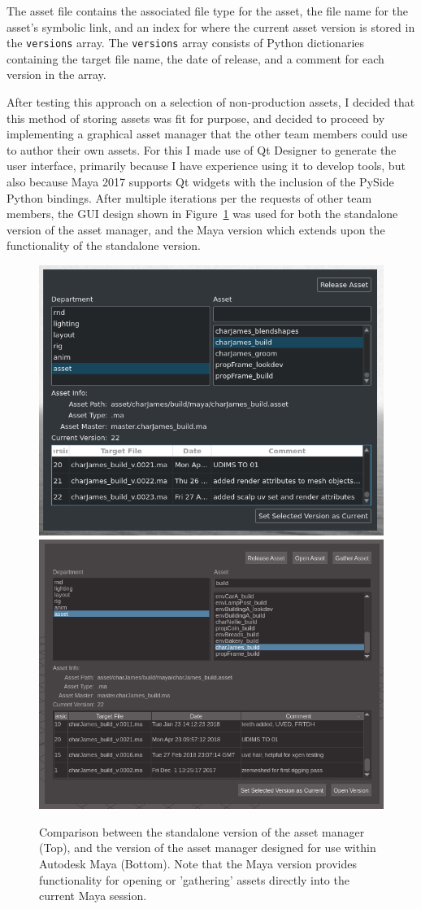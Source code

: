 \documentclass[11pt]{article}
\begin{document}
The asset file contains the associated file type for the asset, the file name for the asset's symbolic link, and an index for where the current asset version is stored in the \texttt{versions} array. The \texttt{versions} array consists of Python dictionaries containing the target file name, the date of release, and a comment for each version in the array.

After testing this approach on a selection of non-production assets, I decided that this method of storing assets was fit for purpose, and decided to proceed by implementing a graphical asset manager that the other team members could use to author their own assets. For this I made use of Qt Designer to generate the user interface, primarily because I have experience using it to develop tools, but also because Maya 2017 supports Qt widgets with the inclusion of the PySide Python bindings. After multiple iterations per the requests of other team members, the GUI design shown in Figure~\ref{figure:assetManagerGui} was used for both the standalone version of the asset manager, and the Maya version which extends upon the functionality of the standalone version.

\begin{figure}[htbp]
\centering
\includegraphics[width=0.8\linewidth]{images/amStandalone.png}
\includegraphics[width=0.8\linewidth]{images/amGuiMaya.png}
\caption{\label{figure:assetManagerGui} Comparison between the standalone version of the asset manager (Top), and the version of the asset manager designed for use within Autodesk Maya (Bottom). Note that the Maya version provides functionality for opening or 'gathering' assets directly into the current Maya session.}
\end{figure}
\end{document}
